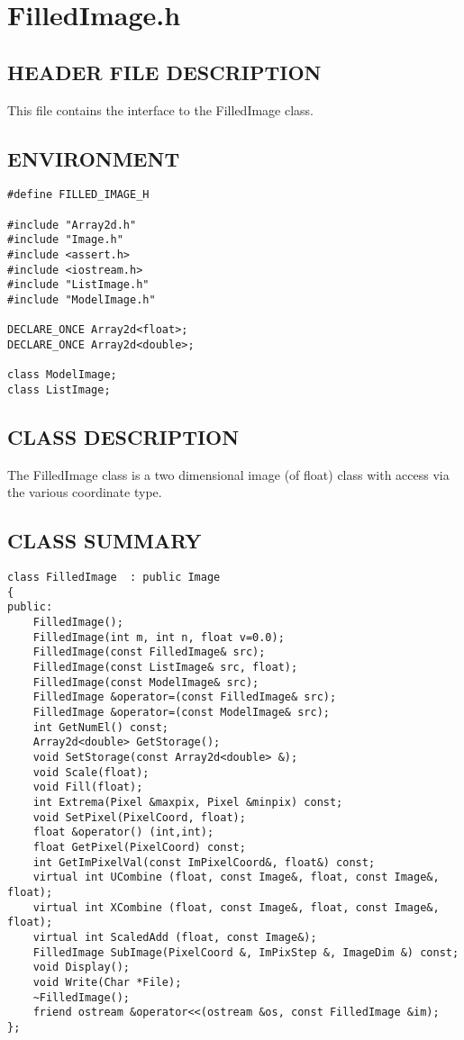 \clearpage
\section{FilledImage.h}

\subsection*{HEADER FILE DESCRIPTION}
   This file contains the interface to the FilledImage class.
  
\subsection*{ENVIRONMENT}
\begin{verbatim}
#define FILLED_IMAGE_H

#include "Array2d.h"
#include "Image.h"
#include <assert.h>
#include <iostream.h>
#include "ListImage.h"
#include "ModelImage.h"

DECLARE_ONCE Array2d<float>;
DECLARE_ONCE Array2d<double>;

class ModelImage;
class ListImage;
\end{verbatim}

\subsection*{CLASS DESCRIPTION}
   The FilledImage class is a two dimensional image (of float) class with
   access via the various coordinate type.

\subsection*{CLASS SUMMARY}
\begin{verbatim}
class FilledImage  : public Image
{
public:
    FilledImage();
    FilledImage(int m, int n, float v=0.0);
    FilledImage(const FilledImage& src);
    FilledImage(const ListImage& src, float);
    FilledImage(const ModelImage& src);
    FilledImage &operator=(const FilledImage& src);
    FilledImage &operator=(const ModelImage& src); 
    int GetNumEl() const;
    Array2d<double> GetStorage();
    void SetStorage(const Array2d<double> &);
    void Scale(float);
    void Fill(float);
    int Extrema(Pixel &maxpix, Pixel &minpix) const;
    void SetPixel(PixelCoord, float);
    float &operator() (int,int);
    float GetPixel(PixelCoord) const;
    int GetImPixelVal(const ImPixelCoord&, float&) const;
    virtual int UCombine (float, const Image&, float, const Image&, float);
    virtual int XCombine (float, const Image&, float, const Image&, float);
    virtual int ScaledAdd (float, const Image&);
    FilledImage SubImage(PixelCoord &, ImPixStep &, ImageDim &) const;
    void Display();
    void Write(Char *File);
    ~FilledImage();
    friend ostream &operator<<(ostream &os, const FilledImage &im);
};
\end{verbatim}

